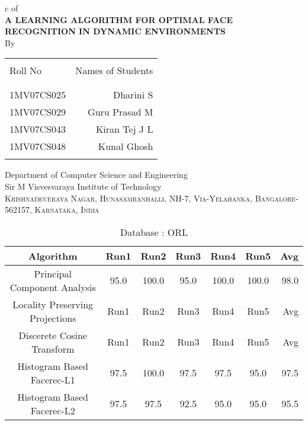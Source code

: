 \documentclass[10pt,a4paper]{article}
\begin{document}
\begin{center}

c
\textup{\Large of }\\[0.5cm]


\uppercase{\Large \textbf {A Learning Algorithm for Optimal Face Recognition in Dynamic Environments}}\\[3.0cm]

\vspace{1.0cm}
\normalsize By \\
\begin{table}[h]
\centering
\begin{tabular}{lr}\hline \\
Roll No & Names of Students \\ \\ \hline
\\
1MV07CS025 & Dharini S \\
1MV07CS029 & Guru Prasad M \\
1MV07CS043 & Kiran Tej J L \\
1MV07CS048 & Kunal Ghosh \\ \\ \hline 
\end{tabular}
\end{table}

\vfill

\normalsize

\Large{Department of Computer Science and Engineering}\\
\LARGE{Sir M Visvesvaraya Institute of Technology }\\
\normalsize
\textsc{Krishnadeveraya Nagar, Hunasamranhalli, NH-7,
Via-Yelahanka, Bangalore-562157, Karnataka, India}\\

\vspace{0.5cm}

\newpage

\begin{table}
\caption{Database : ORL}
\centering
\begin{tabular}{| c | c | c | c | c | c | r | } \hline 
Algorithm & Run1 & Run2 & Run3 & Run4 & Run5 & Avg  \\  
\hline
Principal Component Analysis & 95.0 & 100.0 & 95.0 & 100.0 & 100.0 & 98.0 \\
\hline
Locality Preserving Projections & Run1 & Run2 & Run3 & Run4 & Run5 & Avg \\
\hline
Discerete Cosine Transform & Run1 & Run2 & Run3 & Run4 & Run5 & Avg \\
\hline
Histogram Based Facerec-L1 & 97.5 & 100.0 & 97.5 & 97.5 & 95.0 & 97.5 \\
\hline
Histogram Based Facerec-L2 & 97.5 & 97.5 & 92.5 & 95.0 & 95.0 & 95.5 \\
\hline
\end{tabular}
\end{table}



\end{center}
\end{document}
